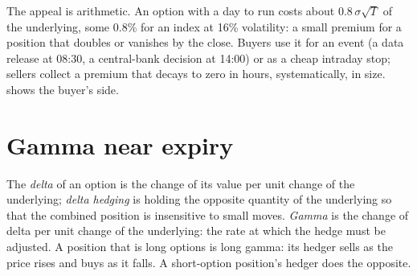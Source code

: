 The appeal is arithmetic. An  option with a day to run costs
about $0.8\,\sigma\sqrt{T}$ of the underlying, some 0.8\% for an index at 16\%
volatility: a small premium for a position that doubles or vanishes by the
close. Buyers use it for an event (a data release at 08:30, a central-bank
decision at 14:00) or as a cheap intraday stop; sellers collect a premium that
decays to zero in hours, systematically, in size.
 shows the buyer's side.

\begin{omfigure}

\label{fig:m1:zero-day-options-and-retail-flow:straddle}
\end{omfigure}

\section{Gamma near expiry}

\begin{definition}\label{def:m1:zero-day-options-and-retail-flow:gamma}
The \emph{delta} of an option is the change of its value per unit change of
the underlying; \emph{delta hedging} is holding the
opposite quantity of the underlying so that the combined position is
insensitive to small moves. \emph{Gamma} is the change of delta
per unit change of the underlying: the rate at which the hedge must be
adjusted. A position that is long options is long gamma: its hedger sells as
the price rises and buys as it falls. A short-option position's hedger does
the opposite.
\end{definition}

